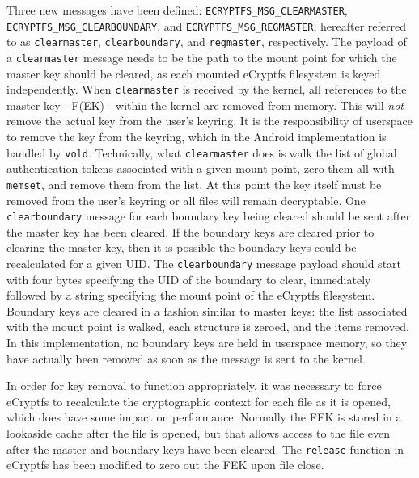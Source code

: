 Three new messages have been defined: \texttt{ECRYPTFS\_MSG\_CLEARMASTER}, \texttt{ECRYPTFS\_MSG\_CLEARBOUNDARY}, and
\texttt{ECRYPTFS\_MSG\_REGMASTER}, hereafter referred to as \texttt{clearmaster}, \texttt{clearboundary}, and \texttt{regmaster},
respectively. The payload of a \texttt{clearmaster} message needs to be the path to the mount point for which the master key should
be cleared, as each mounted eCryptfs filesystem is keyed independently. When \texttt{clearmaster} is received by the kernel, all
references to the master key - F(EK) - within the kernel are removed from memory. This will \emph{not} remove the
actual key from the user's keyring. It is the responsibility of userspace to remove the key from the keyring, which in the Android
implementation is handled by \texttt{vold}.  Technically, what \texttt{clearmaster} does is walk the list of global authentication
tokens associated with a given mount point, zero them all with \texttt{memset}, and remove them from the list.  At this point the
key itself must be removed from the user's keyring or all files will remain decryptable. One \texttt{clearboundary} message for each
boundary key being cleared should be sent after the master key has been cleared. If the boundary keys are cleared prior to clearing
the master key, then it is possible the boundary keys could be recalculated for a given UID. The \texttt{clearboundary}
message payload should start with four bytes specifying the UID of the boundary to clear, immediately followed by a string
specifying the mount point of the eCryptfs filesystem. Boundary keys are cleared in a fashion similar to master keys: the list
associated with the mount point is walked, each structure is zeroed, and the items removed.  In this implementation, no boundary
keys are held in userspace memory, so they have actually been removed as soon as the message is sent to the kernel. 

In order for key removal to function appropriately, it was necessary to force eCryptfs to recalculate the cryptographic context for
each file as it is opened, which does have some impact on performance. Normally the FEK is stored in a lookaside cache after the
file is opened, but that allows access to the file even after the master and boundary keys have been cleared. The \texttt{release}
function in eCryptfs has been modified to zero out the FEK upon file close.

